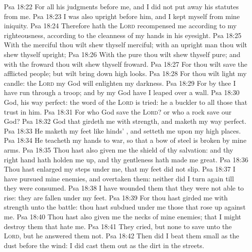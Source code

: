 \vs Psa 18:22 For all his judgments  before me, and I did not put away his statutes from me.
\vs Psa 18:23 I was also upright before him, and I kept myself from mine iniquity.
\vs Psa 18:24 Therefore hath the \textsc{Lord} recompensed me according to my righteousness, according to the cleanness of my hands in his eyesight.
\vs Psa 18:25 With the merciful thou wilt shew thyself merciful; with an upright man thou wilt shew thyself upright;
\vs Psa 18:26 With the pure thou wilt shew thyself pure; and with the froward thou wilt shew thyself froward.
\vs Psa 18:27 For thou wilt save the afflicted people; but wilt bring down high looks.
\vs Psa 18:28 For thou wilt light my candle: the \textsc{Lord} my God will enlighten my darkness.
\vs Psa 18:29 For by thee I have run through a troop; and by my God have I leaped over a wall.
\vs Psa 18:30  God, his way  perfect: the word of the \textsc{Lord} is tried: he  a buckler to all those that trust in him.
\vs Psa 18:31 For who  God save the \textsc{Lord}? or who  a rock save our God?
\vs Psa 18:32  God that girdeth me with strength, and maketh my way perfect.
\vs Psa 18:33 He maketh my feet like hinds' , and setteth me upon my high places.
\vs Psa 18:34 He teacheth my hands to war, so that a bow of steel is broken by mine arms.
\vs Psa 18:35 Thou hast also given me the shield of thy salvation: and thy right hand hath holden me up, and thy gentleness hath made me great.
\vs Psa 18:36 Thou hast enlarged my steps under me, that my feet did not slip.
\vs Psa 18:37 I have pursued mine enemies, and overtaken them: neither did I turn again till they were consumed.
\vs Psa 18:38 I have wounded them that they were not able to rise: they are fallen under my feet.
\vs Psa 18:39 For thou hast girded me with strength unto the battle: thou hast subdued under me those that rose up against me.
\vs Psa 18:40 Thou hast also given me the necks of mine enemies; that I might destroy them that hate me.
\vs Psa 18:41 They cried, but  none to save  unto the \textsc{Lord}, but he answered them not.
\vs Psa 18:42 Then did I beat them small as the dust before the wind: I did cast them out as the dirt in the streets.
